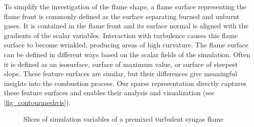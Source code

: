 To simplify the investigation of the flame shape, a flame surface representing
the flame front is commonly defined as the surface separating burned and unburnt
gases. It is contained in the flame front and its surface normal is aligned with
the gradients of the scalar variables.
%
%
Interaction with turbulence causes this flame surface to become wrinkled,
producing areas of high curvature. The flame surface can be defined in different
ways based on the scalar fields of the simulation. Often it is defined as an
isosurface, surface of maximum value, or surface of steepest slope. These
feature surfaces are similar, but their differences give meaningful insights
into the combustion process. Our sparse representation directly captures these
feature surfaces and enables their analysis and visualization (see
\cref{fig_contourmeshvis}).

\begin{figure}[t]
    \setlength\figurewidth\textwidth
    \centering
    
    \caption{Slices of simulation variables of a premixed turbulent syngas flame}
    \label{fig:sim_vars}
\end{figure}


